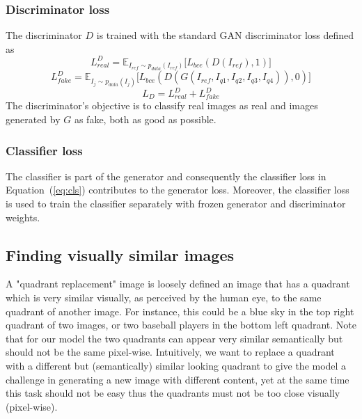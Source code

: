 \documentclass[12pt,a4paper]{article}
\begin{document}
\subsubsection{Discriminator loss}
The discriminator $D$ is trained with the standard GAN discriminator loss defined as
\begin{equation} \label{eq:lorbms_D_real}
    L^D_{real} = \mathbb{E}_{I_{ref}\sim p_{data} (I_{ref})}\big[ L_{bce}(D(I_{ref}), 1)\big]
\end{equation}
\begin{equation} \label{eq:lorbms_D_fake}
    L^D_{fake} =  \mathbb{E}_{I_{j}\sim p_{data} (I_{j})}\big[ L_{bce}(D(G(I_{ref},I_{q1},I_{q2},I_{q3},I_{q4})), 0)\big]
\end{equation}
\begin{equation} \label{eq:lorbms_D}
    L_{D} = L^D_{real} + L^D_{fake}
\end{equation}
The discriminator's objective is to classify real images as real and images generated by $G$ as fake, both as good as possible.

\subsubsection{Classifier loss}
The classifier is part of the generator and consequently the classifier loss in Equation~(\ref{eq:cls}) contributes to the generator loss. Moreover, the classifier loss is used to train the classifier separately with frozen generator and discriminator weights.

\subsection{Finding visually similar images} \label{subsec:img_clustering}
A "quadrant replacement" image is loosely defined an image that has a quadrant which is very similar visually, as perceived by the human eye, to the same quadrant of another image. For instance, this could be a blue sky in the top right quadrant of two images, or two baseball players in the bottom left quadrant. Note that for our model the two quadrants can appear very similar semantically but should not be the same pixel-wise. Intuitively, we want to replace a quadrant with a different but (semantically) similar looking quadrant to give the model a challenge in generating a new image with different content, yet at the same time this task should not be easy thus the quadrants must not be too close visually (pixel-wise).
\end{document}
